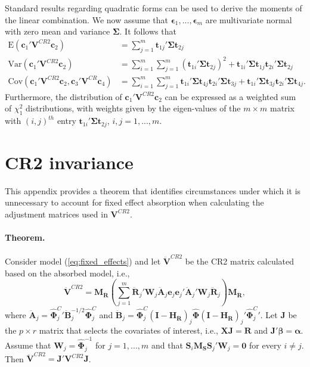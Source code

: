 \documentclass[12pt]{article}\usepackage[]{graphicx}\usepackage[]{color}
\newcommand{\E}{\text{E}}
\newcommand{\Cov}{\text{Cov}}
\newcommand{\Var}{\text{Var}}
\newcommand{\bm}{\mathbf}
\newcommand{\bs}{\boldsymbol}
\begin{document}
Standard results regarding quadratic forms can be used to derive the moments of the linear combination. We now assume that $\bs\epsilon_1,...,\bs\epsilon_m$ are multivariate normal with zero mean and variance $\bs\Sigma$. It follows that 
\begin{align}
\label{eq:CRVE_expectation}
\E\left(\bm{c}_1' \bm{V}^{CR2} \bm{c}_2\right) &= \sum_{j=1}^m \bm{t}_{1j}' \bs\Sigma \bm{t}_{2j} \\
\label{eq:CRVE_variance}
\Var\left(\bm{c}_1' \bm{V}^{CR2} \bm{c}_2\right) &= \sum_{i=1}^m \sum_{j=1}^m \left(\bm{t}_{1i}' \bs\Sigma \bm{t}_{2j}\right)^2 + \bm{t}_{1i}' \bs\Sigma \bm{t}_{1j} \bm{t}_{2i}' \bs\Sigma \bm{t}_{2j} \\
\label{eq:CRVE_covariance}
\Cov\left(\bm{c}_1' \bm{V}^{CR2} \bm{c}_2, \bm{c}_3' \bm{V}^{CR} \bm{c}_4\right) &= \sum_{i=1}^m \sum_{j=1}^m \bm{t}_{1i}' \bs\Sigma \bm{t}_{4j} \bm{t}_{2i}' \bs\Sigma \bm{t}_{3j} + \bm{t}_{1i}' \bs\Sigma \bm{t}_{3j} \bm{t}_{2i}' \bs\Sigma \bm{t}_{4j}.
\end{align}
Furthermore, the distribution of $\bm{c}_1' \bm{V}^{CR2} \bm{c}_2$ can be expressed as a weighted sum of $\chi^2_1$ distributions, with weights given by the eigen-values of the $m \times m$ matrix with $\left(i,j\right)^{th}$ entry $\bm{t}_{1i}' \bs\Sigma \bm{t}_{2j}$, $i,j=1,...,m$.



\section{CR2 invariance}
\label{app:theorem1}

This appendix provides a theorem that identifies circumstances under which it is unnecessary to account for fixed effect absorption when calculating the adjustment matrices used in $\bm{V}^{CR2}$. 

\paragraph{Theorem.} Consider model (\ref{eq:fixed_effects}) and let $\bm{\ddot{V}}^{CR2}$ be the CR2 matrix calculated based on the absorbed model, i.e., 
\[
\bm{\ddot{V}}^{CR2} = \bm{M_{\ddot{R}}}\left(\sum_{j=1}^m \bm{\ddot{R}}_j'\bm{W}_j \bm{\ddot{A}}_j \bm{e}_j \bm{e}_j' \bm{\ddot{A}}_j' \bm{W}_j \bm{\ddot{R}}_j\right) \bm{M_{\ddot{R}}},
\]
where $\bm{\ddot{A}}_j = {\bs{\hat\Phi}_j^C}' \bm{\ddot{B}}_j^{-1/2}\hat{\bs\Phi}_j^C$ and $\bm{\ddot{B}}_j = \hat{\bs\Phi}_j^C\left(\bm{I} - \bm{H_{\ddot{R}}}\right)_j \hat{\bs\Phi} \left(\bm{I} - \bm{H_{\ddot{R}}}\right)_j' {\bs{\hat\Phi}_j^C}'$.
Let $\bm{J}$ be the $p \times r$ matrix that selects the covariates of interest, i.e., $\bm{X}\bm{J} = \bm{R}$ and $\bm{J}'\bs\beta = \bs\alpha$. 
Assume that $\bm{W}_j = \bs{\hat\Phi}_j^{-1}$ for $j = 1,...,m$ and that $\bm{S}_i \bm{M_S}\bm{S}_j'\bm{W}_j = \bm{0}$ for every $i \neq j$. Then $\bm{\ddot{V}}^{CR2} = \bm{J}'\bm{V}^{CR2}\bm{J}$.
\end{document}
